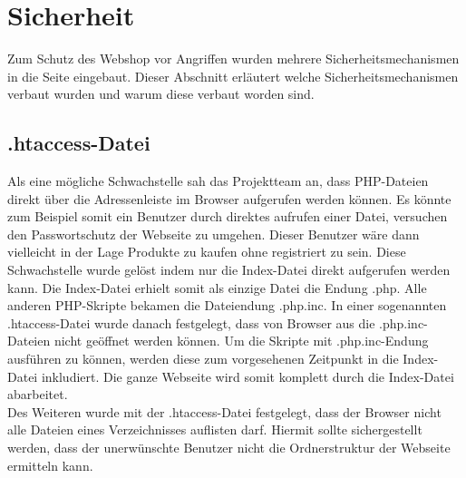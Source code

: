 \section{Sicherheit}
Zum Schutz des Webshop vor Angriffen wurden mehrere Sicherheitsmechanismen in die Seite eingebaut. Dieser Abschnitt erläutert welche Sicherheitsmechanismen verbaut wurden und warum diese verbaut worden sind.

\subsection{\glqq .htaccess\grqq{}-Datei}
Als eine mögliche Schwachstelle sah das Projektteam an, dass PHP-Dateien direkt über die Adressenleiste im Browser aufgerufen werden können. Es könnte zum Beispiel somit ein Benutzer durch direktes aufrufen einer Datei, versuchen den Passwortschutz der Webseite zu umgehen. Dieser Benutzer wäre dann vielleicht in der Lage Produkte zu kaufen ohne registriert zu sein. Diese Schwachstelle wurde gelöst indem nur die Index-Datei direkt aufgerufen werden kann. Die Index-Datei erhielt somit als einzige Datei die Endung \glqq *.php\grqq{}. Alle anderen PHP-Skripte bekamen die Dateiendung \glqq *.php.inc\grqq{}. In einer sogenannten \glqq .htaccess\grqq{}-Datei wurde danach festgelegt, dass von Browser aus die \glqq *.php.inc\grqq{}-Dateien nicht geöffnet werden können. Um die Skripte mit \glqq *.php.inc\grqq{}-Endung ausführen zu können, werden diese zum vorgesehenen Zeitpunkt in die Index-Datei inkludiert. Die ganze Webseite wird somit komplett durch die Index-Datei abarbeitet.\\
Des Weiteren wurde mit der \glqq .htaccess\grqq{}-Datei festgelegt, dass der Browser nicht alle Dateien eines Verzeichnisses auflisten darf. Hiermit sollte sichergestellt werden, dass der unerwünschte Benutzer nicht die Ordnerstruktur der Webseite ermitteln kann.

